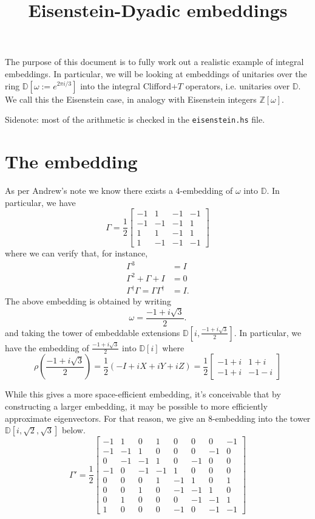\documentclass{article}
\title{Eisenstein-Dyadic embeddings}
\begin{document}
\maketitle

The purpose of this document is to fully work out a realistic example of integral embeddings. In particular, we will be looking at embeddings of unitaries over the ring $\mathbb{D}[\omega := e^{2\pi i/3}]$ into the integral Clifford+$T$ operators, i.e. unitaries over $\mathbb{D}$. We call this the Eisenstein case, in analogy with Eisenstein integers $\mathbb{Z}[\omega]$.

Sidenote: most of the arithmetic is checked in the \texttt{eisenstein.hs} file.

\section{The embedding}

As per Andrew's note we know there exists a $4$-embedding of $\omega$ into $\mathbb{D}$. In particular, we have
\[
	\Gamma = \frac{1}{2}
	\begin{bmatrix} 
		-1 & 1 & -1 & -1 \\
		-1 & -1 & -1 & 1 \\
		1 & 1 & -1 & 1 \\
		1 & -1 & -1 & -1
	\end{bmatrix}
\]
where we can verify that, for instance,
\begin{align*}
	\Gamma^3 &= I \\
	\Gamma^2 + \Gamma + I &= 0 \\
	\Gamma^\dagger \Gamma = \Gamma\Gamma^\dagger &= I.
\end{align*}
The above embedding is obtained by writing
\[
	\omega = \frac{-1 + i\sqrt{3}}{2}.
\]
and taking the tower of embeddable extensions $\mathbb{D}[i, \frac{-1 + i\sqrt{3}}{2}]$. In particular, we have the embedding of $\frac{-1 + i\sqrt{3}}{2}$ into $\mathbb{D}[i]$ where
\[
	\rho\left(\frac{-1 + i\sqrt{3}}{2}\right) 
	= \frac{1}{2}\left(-I + iX + iY + iZ\right) 
	= \frac{1}{2}\begin{bmatrix}  -1 + i & 1 + i \\ -1 + i & -1 -i \end{bmatrix}
\]

While this gives a more space-efficient embedding, it's conceivable that by constructing a larger embedding, it may be possible to more efficiently approximate eigenvectors. For that reason, we give an $8$-embedding into the tower $\mathbb{D}[i, \sqrt{2}, \sqrt{3}]$ below.
\[
	\Gamma' = \frac{1}{2}
	\begin{bmatrix}
		-1 & 1 & 0 & 1 & 0 & 0 & 0 & -1 \\
		-1 & -1 & 1 & 0 & 0 & 0 & -1 & 0 \\
		0 & -1 & -1 & 1 & 0 & -1 & 0 & 0 \\
		-1 & 0 & -1 & -1 & 1 & 0 & 0 & 0 \\
		0 & 0 & 0 & 1 & -1 & 1 & 0 & 1 \\
		0 & 0 & 1 & 0  & -1 & -1 & 1 & 0 \\
		0 & 1 & 0 & 0 & 0 & -1 & -1 & 1 \\
		1 & 0 & 0 & 0 & -1 & 0 & -1 & -1
	\end{bmatrix}
\]
\end{document}
